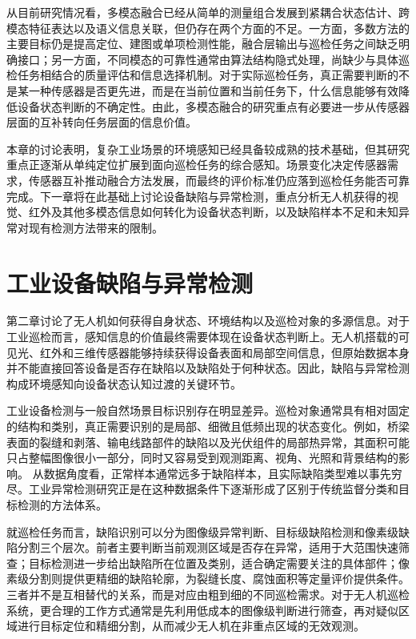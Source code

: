从目前研究情况看，多模态融合已经从简单的测量组合发展到紧耦合状态估计、跨模态特征表达以及语义信息关联，但仍存在两个方面的不足。一方面，多数方法的主要目标仍是提高定位、建图或单项检测性能，融合层输出与巡检任务之间缺乏明确接口；另一方面，不同模态的可靠性通常由算法结构隐式处理，尚缺少与具体巡检任务相结合的质量评估和信息选择机制。对于实际巡检任务，真正需要判断的不是某一种传感器是否更先进，而是在当前位置和当前任务下，什么信息能够有效降低设备状态判断的不确定性。由此，多模态融合的研究重点有必要进一步从传感器层面的互补转向任务层面的信息价值。

本章的讨论表明，复杂工业场景的环境感知已经具备较成熟的技术基础，但其研究重点正逐渐从单纯定位扩展到面向巡检任务的综合感知。场景变化决定传感器需求，传感器互补推动融合方法发展，而最终的评价标准仍应落到巡检任务能否可靠完成。下一章将在此基础上讨论设备缺陷与异常检测，重点分析无人机获得的视觉、红外及其他多模态信息如何转化为设备状态判断，以及缺陷样本不足和未知异常对现有检测方法带来的限制。

\section{工业设备缺陷与异常检测}

第二章讨论了无人机如何获得自身状态、环境结构以及巡检对象的多源信息。对于工业巡检而言，感知信息的价值最终需要体现在设备状态判断上。无人机搭载的可见光、红外和三维传感器能够持续获得设备表面和局部空间信息，但原始数据本身并不能直接回答设备是否存在缺陷以及缺陷处于何种状态。因此，缺陷与异常检测构成环境感知向设备状态认知过渡的关键环节。

工业设备检测与一般自然场景目标识别存在明显差异。巡检对象通常具有相对固定的结构和类别，真正需要识别的是局部、细微且低频出现的状态变化。例如，桥梁表面的裂缝和剥落、输电线路部件的缺陷以及光伏组件的局部热异常，其面积可能只占整幅图像很小一部分，同时又容易受到观测距离、视角、光照和背景结构的影响\cite{Nguyen2018PowerLine,Jeong2020BridgeReview,Zhang2022UBI,Yahya2022PVReview,hua2025aerialsmall,zhang2025lowaltitudeuav,zhu2021visdrone}。 从数据角度看，正常样本通常远多于缺陷样本，且实际缺陷类型难以事先穷尽。工业异常检测研究正是在这种数据条件下逐渐形成了区别于传统监督分类和目标检测的方法体系\cite{Diers2023IJCVIQC,Liu2024IADSurvey,Li2025IADSurvey}。

就巡检任务而言，缺陷识别可以分为图像级异常判断、目标级缺陷检测和像素级缺陷分割三个层次。前者主要判断当前观测区域是否存在异常，适用于大范围快速筛查；目标检测进一步给出缺陷所在位置及类别，适合确定需要关注的具体部件；像素级分割则提供更精细的缺陷轮廓，为裂缝长度、腐蚀面积等定量评价提供条件\cite{Diers2023IJCVIQC,Taox2021Survey,shukla2025iadsurvey,li2025iadreview}。 三者并不是互相替代的关系，而是对应由粗到细的不同巡检需求。对于无人机巡检系统，更合理的工作方式通常是先利用低成本的图像级判断进行筛查，再对疑似区域进行目标定位和精细分割，从而减少无人机在非重点区域的无效观测。

